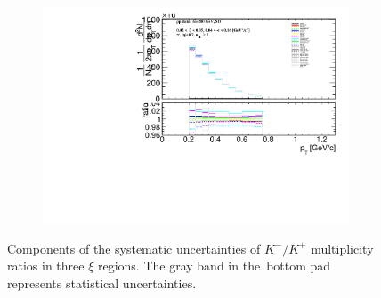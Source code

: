 \begin{figure}[h!]
\begin{subfigure}{.49\textwidth}
		\end{subfigure}
		\begin{subfigure}{.49\textwidth}
			\includegraphics[width=\textwidth,page=24]{chapters/chrgSTAR/img/syst/outPID_SDT.pdf}
		\end{subfigure}
		\begin{minipage}{.49\textwidth}
			\caption{Components of the systematic uncertainties of $K^-/K^+$ multiplicity ratios  in three $\xi$ regions. The gray band in the~bottom pad represents statistical uncertainties.}
			\label{fig:results_star_syst_K}
		\end{minipage}
		
\end{figure}

